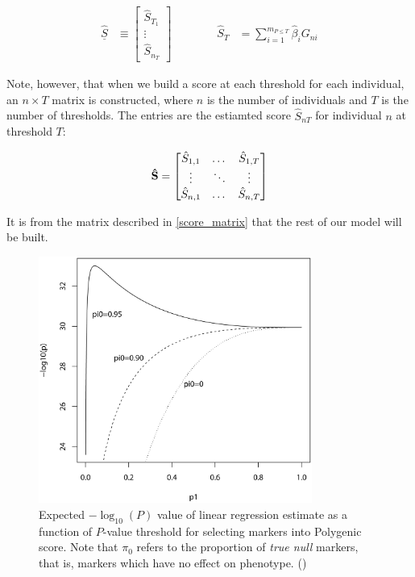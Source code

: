 $$ \begin{aligned} \underline{\hat{S}} &\equiv \begin{bmatrix} \hat{S}_{T_1} \\ \vdots \\ \hat{S}_{n_T} \end{bmatrix} &&&&& \hat{S}_T &= \sum^{m_{P \leq T}}_{i=1} \hat{\beta}_i G_{ni} \end{aligned}$$

Note, however, that when we build a score at each threshold for each individual, an $n \times T$ matrix is constructed, where $n$ is the number of individuals and $T$ is the number of thresholds. The entries are the estiamted score $\hat{S}_{nT}$ for individual $n$ at threshold $T$:

\begin{equation} 
\label{score_matrix}
\begin{aligned}
\bold{\hat{S}} = \begin{bmatrix} \hat{S}_{1,1} & \dots & \hat{S}_{1, T} \\ \vdots & \ddots & \vdots \\ \hat{S}_{n, 1} & \dots & \hat{S}_{n, T} \end{bmatrix}
\end{aligned}
\end{equation}

It is from the matrix described in \ref{score_matrix} that the rest of our model will be built.

\begin{figure}[h]
\label{pi0}
\caption{Expected $-\log_{10} (P)$ value of linear regression estimate as a function of $P$-value threshold for selecting markers into Polygenic score. Note that $\pi_0$ refers to the proportion of \textit{true null} markers, that is, markers which have no effect on phenotype. (\cite{Dudbridge2013})}
\centering
\includegraphics[width=0.8\textwidth]{Figures/pi0.png}
\end{figure}

